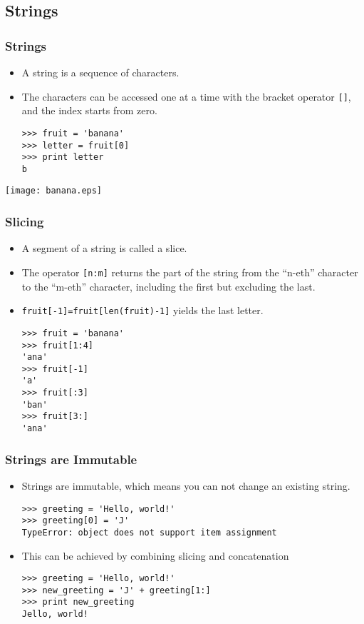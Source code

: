 \documentclass{beamer}
\newcommand{\beforeverb}{\footnotesize}
\newcommand{\afterverb}{\normalsize}
\begin{document}
\subsection[Strings]{Strings}
\begin{frame}[fragile]
\frametitle{Strings}
\begin{itemize}

\item A \alert{string} is a sequence of characters.
\item  The characters can be accessed one at a time with the bracket
operator \verb![]!, and the index starts from zero.
\small
\begin{verbatim}
>>> fruit = 'banana'
>>> letter = fruit[0]
>>> print letter
b
\end{verbatim}
\normalsize
\end{itemize}
\centerline{\texttt{[image: banana.eps]}}

\end{frame}
\begin{frame}[fragile]
\frametitle{Slicing}
\begin{itemize}
\item A segment of a string is called a \alert{slice}.  
\item The operator {\tt [n:m]} returns the part of the string from the 
``n-eth'' character to the ``m-eth'' character, including the first but \alert{excluding the last}.
\item {\tt fruit[-1]=fruit[len(fruit)-1]} yields the last letter.
\beforeverb
\begin{verbatim}
>>> fruit = 'banana'
>>> fruit[1:4]
'ana'
>>> fruit[-1]
'a'
>>> fruit[:3]
'ban'
>>> fruit[3:]
'ana'
\end{verbatim}
\afterverb
\end{itemize}
\end{frame}
\begin{frame}[fragile]
\frametitle{Strings are Immutable}
\begin{itemize}
\item Strings are \alert{immutable}, which means you \alert{can not} change an
existing string. 
\beforeverb
\begin{verbatim}
>>> greeting = 'Hello, world!'
>>> greeting[0] = 'J'
TypeError: object does not support item assignment
\end{verbatim}
\afterverb
%
\item This can be achieved by combining slicing and concatenation
\beforeverb
\begin{verbatim}
>>> greeting = 'Hello, world!'
>>> new_greeting = 'J' + greeting[1:]
>>> print new_greeting
Jello, world!
\end{verbatim}
\afterverb

\end{itemize}
\end{frame}
\end{document}
